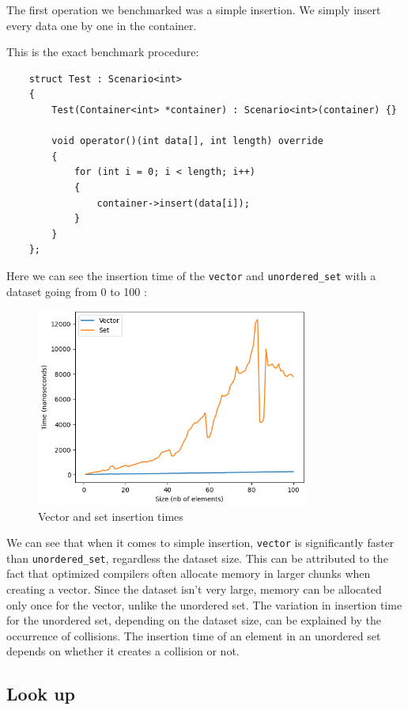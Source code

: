 \documentclass[conference]{IEEEtran} \IEEEoverridecommandlockouts
\def\code#1{\texttt{#1}}
\begin{document}
The first operation we benchmarked was a simple insertion. We simply 
insert every data one by one in the container. 

This is the exact benchmark procedure:
\begin{lstlisting}
	struct Test : Scenario<int>
	{
		Test(Container<int> *container) : Scenario<int>(container) {}
		
		void operator()(int data[], int length) override
		{
			for (int i = 0; i < length; i++)
			{
				container->insert(data[i]);
			}
		}
	};
\end{lstlisting}

Here we can see the insertion time of the \code{vector} and 
\code{unordered\_set} with a dataset going from 0 to 100 :

\begin{figure}[!h]
	\includegraphics[width=9cm]{Diagram/insertion.png}
	\caption{Vector and set insertion times}
	\label{vector vs set insertion}
\end{figure}

We can see that when it comes to simple insertion, \code{vector} is 
significantly  faster than \code{unordered\_set}, regardless the 
dataset size. This can be attributed to the fact that optimized 
compilers often allocate memory in larger chunks when creating a vector. 
Since the dataset isn't very large, memory can be allocated only once 
for the vector, unlike the unordered set. The variation in insertion 
time for the unordered set, depending on the dataset size, can be 
explained by the occurrence of collisions. The insertion time of an 
element in an unordered set depends on whether it creates a collision 
or not.

\subsection{Look up}
\end{document}
